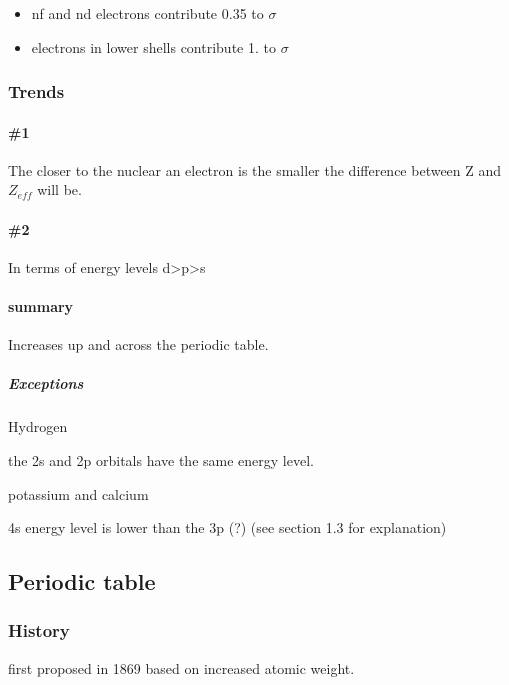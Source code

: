 \documentclass[]{article}
\providecommand{\tightlist}{%
  \setlength{\itemsep}{0pt}\setlength{\parskip}{0pt}}
\let\oldparagraph\paragraph
\renewcommand{\paragraph}[1]{\oldparagraph{#1}\mbox{}}
\let\oldsubparagraph\subparagraph
\renewcommand{\subparagraph}[1]{\oldsubparagraph{#1}\mbox{}}
\begin{document}
\begin{itemize}
\tightlist
\item
  nf and nd electrons contribute 0.35 to \(\sigma\quad\)
\item
  electrons in lower shells contribute 1. to \(\sigma\quad\)
\end{itemize}

\subsubsection{Trends}\label{trends}

\paragraph{\#1}\label{section}

The closer to the nuclear an electron is the smaller the difference
between Z and \(Z_{eff}\) will be.

\paragraph{\#2}\label{section-1}

In terms of energy levels d\textgreater{}p\textgreater{}s

\paragraph{summary}\label{summary}

Increases up and across the periodic table.

\subparagraph{Exceptions}\label{exceptions}

Hydrogen

the 2s and 2p orbitals have the same energy level.

potassium and calcium

4s energy level is lower than the 3p (?) (see section 1.3 for
explanation)

\subsection{Periodic table}\label{periodic-table}

\subsubsection{History}\label{history}

first proposed in 1869 based on increased atomic weight.
\end{document}
